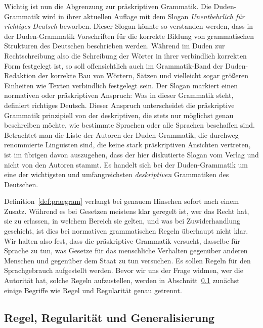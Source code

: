 Wichtig ist nun die Abgrenzung zur präskriptiven Grammatik.
Die Du\-den-Gram\-ma\-tik \citep{Duden8} wird in ihrer aktuellen Auflage mit dem Slogan \textit{Unentbehrlich für richtiges Deutsch} beworben.
Dieser Slogan könnte so verstanden werden, dass in der Du\-den-Gram\-ma\-tik Vorschriften für die korrekte Bildung von grammatischen Strukturen des Deutschen beschrieben werden.
Während im Duden zur Rechtschreibung also die Schreibung der Wörter in ihrer verbindlich korrekten Form festgelegt ist, so soll offensichtlich auch im Grammatik-Band der Duden-Redaktion der korrekte Bau von Wörtern, Sätzen und vielleicht sogar größeren Einheiten wie Texten verbindlich festgelegt sein.
Der Slogan markiert einen normativen oder präskriptiven Anspruch:
Was in dieser Grammatik steht, definiert richtiges Deutsch.
Dieser Anspruch unterscheidet die präskriptive Grammatik prinzipiell von der deskriptiven, die stets nur möglichst genau beschreiben möchte, wie bestimmte Sprachen oder alle Sprachen beschaffen sind.
Betrachtet man die Liste der Autoren der Duden-Grammatik, die durchweg renommierte Linguisten sind, die keine stark präskriptiven Ansichten vertreten, ist im übrigen davon auszugehen, dass der hier diskutierte Slogan vom Verlag und nicht von den Autoren stammt. 
Es handelt sich bei der Duden-Grammatik um eine der wichtigsten und umfangreichsten \textit{deskriptiven} Grammatiken des Deutschen.


Definition~\ref{def:praegram} verlangt bei genauem Hinsehen sofort nach einem Zusatz.
Während es bei Gesetzen meistens klar geregelt ist, wer das Recht hat, sie zu erlassen, in welchem Bereich sie gelten, und was bei Zuwiderhandlung geschieht, ist dies bei normativen grammatischen Regeln überhaupt nicht klar.
Wir halten also fest, dass die präskriptive Grammatik versucht, dasselbe für Sprache zu tun, was Gesetze für das menschliche Verhalten gegenüber anderen Menschen und gegenüber dem Staat zu tun versuchen.
Es sollen Regeln für den Sprachgebrauch aufgestellt werden.
Bevor wir uns der Frage widmen, wer die Autorität hat, solche Regeln aufzustellen, werden in Abschnitt~\ref{sec:regulgen} zunächst einige Begriffe wie Regel und Regularität genau getrennt.

\subsection{Regel, Regularität und Generalisierung}
\label{sec:regulgen}

